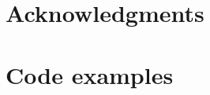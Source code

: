 \documentclass{acm_proc_article-sp}
\begin{document}
\section{Acknowledgments}






%
%
\appendix



\section{Code examples}
\end{document}
